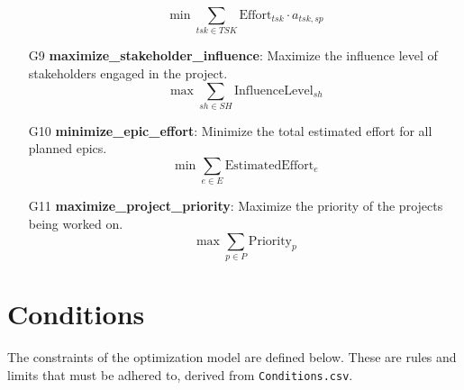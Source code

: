 \documentclass[11pt]{article}
\begin{document}
\begin{itemize}
    $$ \min \sum_{tsk \in TSK} \text{Effort}_{tsk} \cdot a_{tsk,sp} $$
    \item[G9] \textbf{maximize\_stakeholder\_influence}: Maximize the influence level of stakeholders engaged in the project.
    $$ \max \sum_{sh \in SH} \text{InfluenceLevel}_{sh} $$
    \item[G10] \textbf{minimize\_epic\_effort}: Minimize the total estimated effort for all planned epics.
    $$ \min \sum_{e \in E} \text{EstimatedEffort}_{e} $$
    \item[G11] \textbf{maximize\_project\_priority}: Maximize the priority of the projects being worked on.
    $$ \max \sum_{p \in P} \text{Priority}_{p} $$
\end{itemize}

\section{Conditions}
The constraints of the optimization model are defined below. These are rules and limits that must be adhered to, derived from \texttt{Conditions.csv}.
\end{document}
